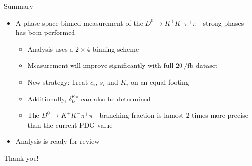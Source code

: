 \documentclass{beamer}
\begin{document}
\begin{frame}{Summary}
  \begin{itemize}
    \setlength\itemsep{1.0em}
    \item{A phase-space binned measurement of the $D^0\to K^+K^-\pi^+\pi^-$ strong-phases has been performed}
    \begin{itemize}
      \setlength\itemsep{0.7em}
      \item{Analysis uses a $2\times 4$ binning scheme}
      \item{Measurement will improve significantly with full $\SI{20}{\per\femto\barn}$ dataset}
      \item{New strategy: Treat $c_i$, $s_i$ and $K_i$ on an equal footing}
      \item{Additionally, $\delta_D^{K\pi}$ can also be determined}
      \item{The $D^0\to K^+K^-\pi^+\pi^-$ branching fraction is lamost $2$ times more precise than the current PDG value}
    \end{itemize}
    \item{Analysis is ready for review}
  \end{itemize}
  \vspace{0.5cm}
  \begin{center}
    {\huge Thank you!}
  \end{center}
\end{frame}
\end{document}

